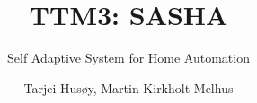 \documentclass{scrartcl}
\begin{document}

\title{TTM3: SASHA} %
\subtitle{Self Adaptive System for Home Automation}
\author{Tarjei Hus{\o}y, Martin Kirkholt Melhus} %

\maketitle






\end{document}
